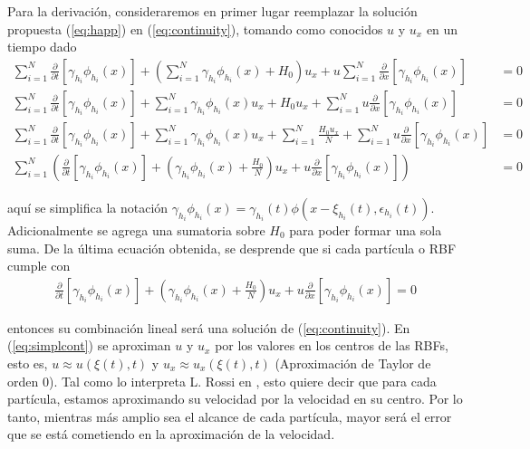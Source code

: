 ﻿\documentclass[spanish]{article}
\begin{document}
     Para la derivación, consideraremos en primer lugar reemplazar la solución propuesta (\ref{eq:happ}) en (\ref{eq:continuity}), tomando como conocidos $u$ y $u_x$ en un tiempo dado
     \begin{align*}
     \sum_{i=1}^{N} \frac{\partial}{\partial t}[\gamma_{h_i}\phi_{h_i}(x)] + \left(\sum_{i=1}^{N} \gamma_{h_i} \phi_{h_i}(x) + H_0\right) u_x + u \sum_{i=1}^N \frac{\partial}{\partial x}[\gamma_{h_i}\phi_{h_i}(x)] & = 0 \\
     \sum_{i=1}^{N} \frac{\partial}{\partial t}[\gamma_{h_i}\phi_{h_i}(x)] + \sum_{i=1}^{N} \gamma_{h_i} \phi_{h_i}(x)u_x + H_0 u_x +  \sum_{i=1}^N u \frac{\partial}{\partial x}[\gamma_{h_i}\phi_{h_i}(x)] & = 0 \\
     \sum_{i=1}^{N} \frac{\partial}{\partial t}[\gamma_{h_i}\phi_{h_i}(x)] + \sum_{i=1}^{N} \gamma_{h_i} \phi_{h_i}(x)u_x + \sum_{i=1}^{N} \frac{H_0 u_x}{N} +  \sum_{i=1}^N u \frac{\partial}{\partial x}[\gamma_{h_i}\phi_{h_i}(x)] & = 0 \\
     \sum_{i=1}^N \left(\frac{\partial}{\partial t}[\gamma_{h_i}\phi_{h_i}(x)] + \left(\gamma_{h_i} \phi_{h_i}(x) + \frac{H_0}{N}\right)u_x + u \frac{\partial}{\partial x}[\gamma_{h_i}\phi_{h_i}(x)]\right) & = 0
     \end{align*}

     \noindent aquí se simplifica la notación $\displaystyle \gamma_{h_i}\phi_{h_i}(x) = \gamma_{h_i}(t)\phi(x-\xi_{h_i}(t),\epsilon_{h_i}(t))$. Adicionalmente se agrega una sumatoria sobre $H_0$ para poder formar una sola suma. De la última ecuación obtenida, se desprende que si cada partícula o RBF cumple con
     \begin{align}
          \frac{\partial}{\partial t}[\gamma_{h_i}\phi_{h_i}(x)] + \left(\gamma_{h_i} \phi_{h_i}(x) + \frac{H_0}{N}\right)u_x + u \frac{\partial}{\partial x}[\gamma_{h_i}\phi_{h_i}(x)] = 0
          \label{eq:simplcont}
      \end{align}

      \noindent entonces su combinación lineal será una solución de (\ref{eq:continuity}). En (\ref{eq:simplcont}) se aproximan $u$ y $u_x$ por los valores en los centros de las RBFs, esto es, $u \approx u(\xi(t),t)$ y $u_x \approx u_x(\xi(t),t)$ (Aproximación de Taylor de orden $0$). Tal como lo interpreta L. Rossi en \cite{rossi}, esto quiere decir que para cada partícula, estamos aproximando su velocidad por la velocidad en su centro. Por lo tanto, mientras más amplio sea el alcance de cada partícula, mayor será el error que se está cometiendo en la aproximación de la velocidad.
\end{document}
